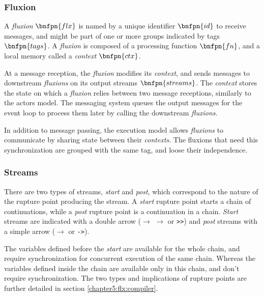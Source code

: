 

\subsubsection{Fluxion}

A \textit{fluxion} $\bnfpn{flx}$ is named by a unique identifier $\bnfpn{id}$ to receive messages, and might be part of one or more groups indicated by tags $\bnfpn{tags}$.
A \textit{fluxion} is composed of a processing function $\bnfpn{fn}$, and a local memory called a \textit{context} $\bnfpn{ctx}$.

At a message reception, the \textit{fluxion} modifies its \textit{context}, and sends messages to downstream \textit{fluxions} on its output streams $\bnfpn{streams}$.
The \textit{context} stores the state on which a \textit{fluxion} relies between two message receptions, similarly to the actors model.
The messaging system queues the output messages for the event loop to process them later by calling the downstream \textit{fluxions}.


In addition to message passing, the execution model allows \textit{fluxions} to communicate by sharing state between their \textit{contexts}.
The fluxions that need this synchronization are grouped with the same tag, and loose their independence.

\subsubsection{Streams}

There are two types of streams, \textit{start} and \textit{post}, which correspond to the nature of the rupture point producing the stream.
A \textit{start} rupture point starts a chain of continuations, while a \textit{post} rupture point is a continuation in a chain.
\textit{Start} streams are indicated with a double arrow ($\to$ \hspace{-1.4em} $\to$ or \texttt{>>}) and \textit{post} streams with a simple arrow ($\to$ or \texttt{->}).

The variables defined before the \textit{start} are available for the whole chain, and require synchronization for concurrent execution of the same chain.
Whereas the variables defined inside the chain are available only in this chain, and don't require synchronization.
The two types and implications of rupture points are further detailed in section \ref{chapter5:flx:compiler}.
